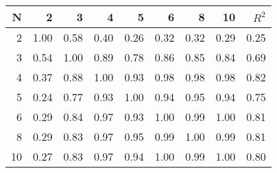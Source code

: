 \begin{tabular}{rrrrrrrrr}
\toprule
  N &     2 &     3 &     4 &     5 &     6 &     8 &    10 &  $R^2$ \\
\midrule
  2 &  1.00 &  0.58 &  0.40 &  0.26 &  0.32 &  0.32 &  0.29 &   0.25 \\
  3 &  0.54 &  1.00 &  0.89 &  0.78 &  0.86 &  0.85 &  0.84 &   0.69 \\
  4 &  0.37 &  0.88 &  1.00 &  0.93 &  0.98 &  0.98 &  0.98 &   0.82 \\
  5 &  0.24 &  0.77 &  0.93 &  1.00 &  0.94 &  0.95 &  0.94 &   0.75 \\
  6 &  0.29 &  0.84 &  0.97 &  0.93 &  1.00 &  0.99 &  1.00 &   0.81 \\
  8 &  0.29 &  0.83 &  0.97 &  0.95 &  0.99 &  1.00 &  0.99 &   0.81 \\
 10 &  0.27 &  0.83 &  0.97 &  0.94 &  1.00 &  0.99 &  1.00 &   0.80 \\
\bottomrule
\end{tabular}
